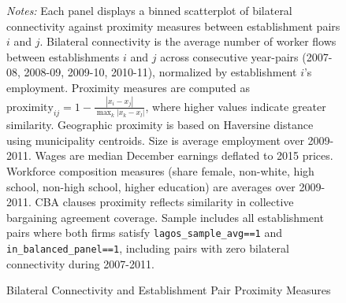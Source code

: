 \begin{figure}[htbp]
\begin{threeparttable}
\caption{Bilateral Connectivity and Establishment Pair Proximity Measures}
\label{fig:binscatters_bilateral}
\begin{tablenotes}
\footnotesize
\item \textit{Notes:} Each panel displays a binned scatterplot of bilateral connectivity against proximity measures between establishment pairs $i$ and $j$. Bilateral connectivity is the average number of worker flows between establishments $i$ and $j$ across consecutive year-pairs (2007-08, 2008-09, 2009-10, 2010-11), normalized by establishment $i$'s employment. Proximity measures are computed as $\text{proximity}_{ij} = 1 - \frac{|x_i - x_j|}{\max_k |x_k - x_l|}$, where higher values indicate greater similarity. Geographic proximity is based on Haversine distance using municipality centroids. Size is average employment over 2009-2011. Wages are median December earnings deflated to 2015 prices. Workforce composition measures (share female, non-white, high school, non-high school, higher education) are averages over 2009-2011. CBA clauses proximity reflects similarity in collective bargaining agreement coverage. Sample includes all establishment pairs where both firms satisfy \texttt{lagos\_sample\_avg==1} and \texttt{in\_balanced\_panel==1}, including pairs with zero bilateral connectivity during 2007-2011.
\end{tablenotes}
\end{threeparttable}
\end{figure}

